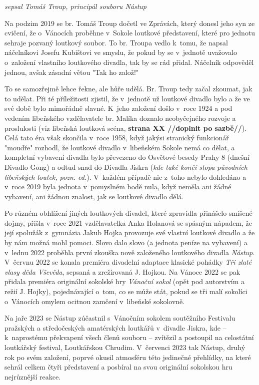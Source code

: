 \documentclass[a5paper, 12pt, twoside]{article}
\begin{document}
\textit{sepsal Tomáš Troup, principál souboru Nástup}

Na podzim 2019 se br. Tomáš Troup dočetl ve Zprávách, který donesl jeho
syn ze cvičení, že o~Vánocích proběhne v~Sokole loutkové představení,
které pro jednotu sehraje pozvaný loutkový soubor. To br. Troupa vedlo
k~tomu, že napsal náčelníkovi Josefu Kubištovi ve smyslu, že pokud by se
v~jednotě uvažovalo o~založení vlastního loutkového divadla, tak by se rád
přidal. Náčelník odpověděl jednou, avšak zásadní větou "Tak ho
založ!{}"

To se samozřejmě lehce řekne, ale hůře udělá. Br. Troup tedy začal
zkoumat, jak to udělat. Při té příležitosti zjistil, že v~jednotě už
loutkové divadlo bylo a že ve své době bylo mimořádně slavné. K~jeho
založení došlo v~roce 1924 a pod vedením libeňského vzdělavatele br.
Malíka doznalo neobyčejného rozvoje a proslulosti (viz libeňská loutková
scéna, \textbf{strana XX //doplnit po sazbě//}). Celá tato éra však skončila
v~roce 1958, když jakýsi stranický funkcionář "moudře" rozhodl, že
loutkové divadlo v~libeňském Sokole nemá co dělat, a kompletní vybavení
divadla bylo převezeno do Osvětové besedy Prahy 8 (dnešní Divadlo Gong)
a odtud snad do Divadla Jiskra (\textit{kde také končí stopa původních
libeňských loutek, pozn. ed.}). V~každém případě nic z~toho nebylo
dohledáno a v~roce 2019 byla jednota v~pomyslném bodě nula, když neměla
ani žádné vybavení, ani žádnou znalost, jak se loutkové divadlo dělá.

Po různém obhlížení jiných loutkových divadel, které zpravidla přinášelo
smíšené dojmy, přišla v~roce 2021 vzdělavatelka Anka Holanová se spásným
nápadem, že její spolužák z~gymnázia Jakub Hojka provozuje své vlastní
loutkové divadlo a že by nám možná mohl pomoci. Slovo dalo slovo (a
jednota peníze na vybavení) a v~lednu 2022 proběhla první zkouška nově
založeného loutkového divadla \textit{Nástup}. V~červnu 2022 se konala
premiéra divadelní adaptace klasické pohádky \textit{Tři zlaté vlasy děda
Vševěda}, sepsaná a zrežírovaná J. Hojkou. Na Vánoce 2022 se pak přidala
premiéra originální sokolské hry \textit{Vánoční sokol} (opět pod
autorstvím a režií J. Hojky), pojednávající o~tom, co se může stát,
pokud se tři malí sokolíci o~Vánocích omylem ocitnou zamčení v~libeňské
sokolovně.

Na jaře 2023 se Nástup zúčastnil s~Vánočním sokolem soutěžního Festivalu
pražských a středočeských amatérských loutkářů v~divadle Jiskra, kde --
k~naprostému překvapení všech členů souboru -- zvítězil a postoupil na
celostátní loutkářský festival, Loutkářskou Chrudim. V~červenci 2023 tak
Nástup, druhý rok po svém založení, poprvé okusil atmosféru této
jedinečné přehlídky, na které sehrál celkem čtyři představení a posbíral
na svou originální sokolskou hru nejrůznější reakce.
\end{document}
